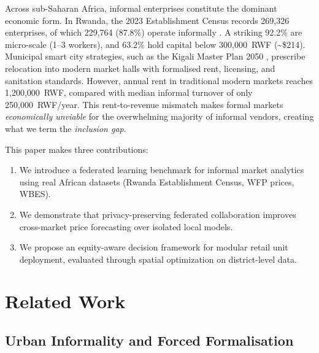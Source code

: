\documentclass{article}
\begin{document}
Across sub-Saharan Africa, informal enterprises constitute the dominant economic form.
In Rwanda, the 2023 Establishment Census records 269,326 enterprises, of which 229,764 (87.8\%) operate informally \cite{nisr2023ec}.
A striking 92.2\% are micro-scale (1--3 workers), and 63.2\% hold capital below 300,000~RWF (\textasciitilde\$214).
Municipal smart city strategies, such as the Kigali Master Plan 2050 \cite{kigali2019master}, prescribe relocation into modern market halls with formalised rent, licensing, and sanitation standards.
However, annual rent in traditional modern markets reaches 1,200,000~RWF, compared with median informal turnover of only 250,000~RWF/year.
This rent-to-revenue mismatch makes formal markets \emph{economically unviable} for the overwhelming majority of informal vendors, creating what we term the \emph{inclusion gap}.

This paper makes three contributions:
\begin{enumerate}[label=\alph*)]
    \item We introduce a federated learning benchmark for informal market analytics using real African datasets (Rwanda Establishment Census, WFP prices, WBES).
    \item We demonstrate that privacy-preserving federated collaboration improves cross-market price forecasting over isolated local models.
    \item We propose an equity-aware decision framework for modular retail unit deployment, evaluated through spatial optimization on district-level data.
\end{enumerate}

\section{Related Work}
\label{sec:background}

\subsection{Urban Informality and Forced Formalisation}
\end{document}
